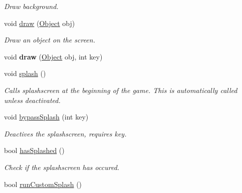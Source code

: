 \begin{DoxyCompactItemize}
\begin{DoxyCompactList}\small\item\em Draw background. \end{DoxyCompactList}\item 
void \hyperlink{classEngine_a276e63ae5648c36051c21c5b7c5dfb4b}{draw} (\hyperlink{classObject}{Object} obj)\hypertarget{classEngine_a276e63ae5648c36051c21c5b7c5dfb4b}{}\label{classEngine_a276e63ae5648c36051c21c5b7c5dfb4b}

\begin{DoxyCompactList}\small\item\em Draw an object on the screen. \end{DoxyCompactList}\item 
void {\bfseries draw} (\hyperlink{classObject}{Object} obj, int key)\hypertarget{classEngine_a81d89df09ee2577fd7deaf2f5e27f93a}{}\label{classEngine_a81d89df09ee2577fd7deaf2f5e27f93a}

\item 
void \hyperlink{classEngine_adb6f1426c5c57f9d60be1e10d8eb2506}{splash} ()\hypertarget{classEngine_adb6f1426c5c57f9d60be1e10d8eb2506}{}\label{classEngine_adb6f1426c5c57f9d60be1e10d8eb2506}

\begin{DoxyCompactList}\small\item\em Calls splashscreen at the beginning of the game. This is automatically called unless deactivated. \end{DoxyCompactList}\item 
void \hyperlink{classEngine_a3b9cf8a050f43e4e185748f7b2a3ded8}{bypass\+Splash} (int key)\hypertarget{classEngine_a3b9cf8a050f43e4e185748f7b2a3ded8}{}\label{classEngine_a3b9cf8a050f43e4e185748f7b2a3ded8}

\begin{DoxyCompactList}\small\item\em Deactives the splashscreen, requires key. \end{DoxyCompactList}\item 
bool \hyperlink{classEngine_aabab82c2ba4dca772a28dbbd4fe08cb4}{has\+Splashed} ()\hypertarget{classEngine_aabab82c2ba4dca772a28dbbd4fe08cb4}{}\label{classEngine_aabab82c2ba4dca772a28dbbd4fe08cb4}

\begin{DoxyCompactList}\small\item\em Check if the splashscreen has occured. \end{DoxyCompactList}\item 
bool \hyperlink{classEngine_a5c87c90c9dd6b3fd652e24af0c7e935d}{run\+Custom\+Splash} ()\hypertarget{classEngine_a5c87c90c9dd6b3fd652e24af0c7e935d}{}\label{classEngine_a5c87c90c9dd6b3fd652e24af0c7e935d}


\end{DoxyCompactItemize}
